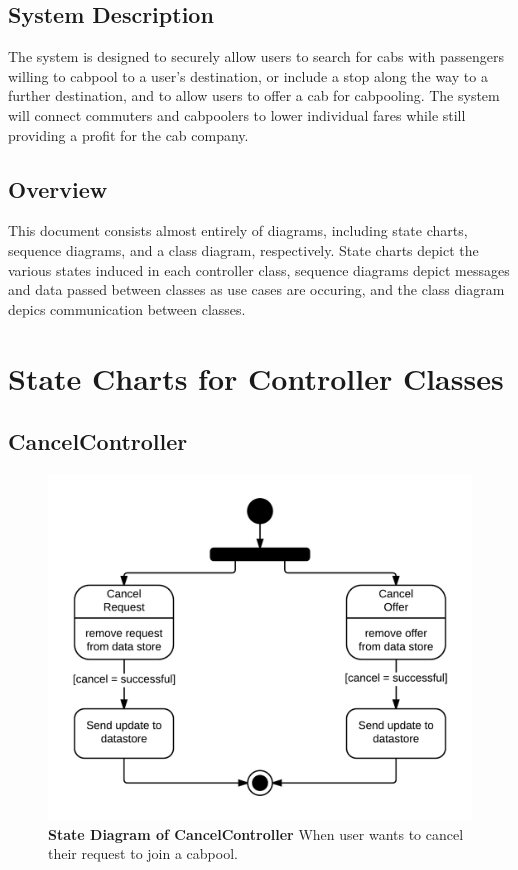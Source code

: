 \documentclass[]{article}
\begin{document}
\subsection{System Description}
\label{sub:system_description}

The system is designed to securely allow users to search for cabs with passengers willing to cabpool to a user’s destination, or include a stop along the way to a further destination, and to allow users to offer a cab for cabpooling. The system will connect commuters and cabpoolers to lower individual fares while still providing a profit for the cab company.
\subsection{Overview}
\label{sub:overview}
	This document consists almost entirely of diagrams, including state charts, sequence diagrams, and a class diagram, respectively. State charts depict the various states induced in each controller class, sequence diagrams depict messages and data passed between classes as use cases are occuring, and the class diagram depics communication between classes.


\section{State Charts for Controller Classes}
\label{sec:state_charts_for_controller_classes}

\subsection{CancelController}
\begin{figure}[H]
\label{CCState}
	\centering
	\includegraphics[width=1\textwidth]{CancelController.png}
	\caption{\textbf{State Diagram of CancelController} When user wants to cancel their request to join a cabpool.}
\end{figure}
\end{document}
